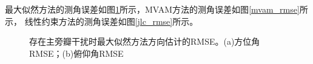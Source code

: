 \documentclass[master]{thesis-uestc}
\begin{document}
最大似然方法的测角误差如图\ref{ml_rmse}所示，MVAM方法的测角误差如图\ref{mvam_rmse}所示，
线性约束方法的测角误差如图\ref{jlc_rmse}所示。
\begin{figure}[H]
    \caption{存在主旁瓣干扰时最大似然方法方向估计的RMSE。(a)方位角RMSE；(b)俯仰角RMSE}
    \label{ml_rmse}
\end{figure}
\end{document}
